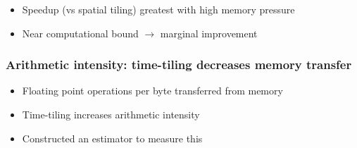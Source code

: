 \documentclass{beamer}
\begin{document}
\begin{frame}
\begin{columns}
\begin{column}{.49\textwidth}
\begin{center}
\end{center}
\end{column}
\end{columns}

\begin{itemize}
	\item Speedup (vs spatial tiling) greatest with high memory pressure
	\item Near computational bound \(\rightarrow\) marginal improvement
\end{itemize}
\end{frame}



\begin{frame}
\frametitle{Arithmetic intensity: time-tiling decreases memory transfer}

\begin{itemize}
	\item Floating point operations per byte transferred from memory
	\newline
	\item Time-tiling increases arithmetic intensity
	\item Constructed an estimator to measure this
\end{itemize}
\end{frame}
\end{document}
